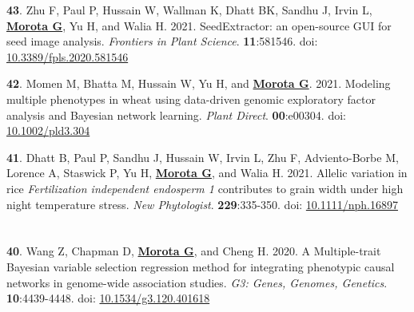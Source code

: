 \documentclass[margin,line,10pt]{res}
\newenvironment{list1}{
  \begin{list}{\ding{113}}{%
      \setlength{\itemsep}{0in}
      \setlength{\parsep}{0in} \setlength{\parskip}{0in}
      \setlength{\topsep}{0in} \setlength{\partopsep}{0in} 
      \setlength{\leftmargin}{0.17in}}}{\end{list}}
\begin{document}
\begin{resume}
\begin{list1}
  \vspace{0.5cm}
  
  \item [{\bf 43}.] Zhu F, Paul P, Hussain W, Wallman K, Dhatt BK, Sandhu J, Irvin L, \textbf{\underline{Morota G}}, Yu H, and Walia H. 2021. SeedExtractor: an open-source GUI for seed image analysis. \emph{Frontiers in Plant Science}. \textbf{11}:581546. doi: \textcolor{blue}{\href{https://doi.org/10.3389/fpls.2020.581546}{10.3389/fpls.2020.581546}}

    \vspace{0.5cm}
    
\item [{\bf 42}.] Momen M, Bhatta M, Hussain W, Yu H, and \textbf{\underline{Morota G}}. 2021. Modeling multiple phenotypes in wheat using data-driven genomic exploratory factor analysis and Bayesian network learning. \emph{Plant Direct}. \textbf{00}:e00304. doi: \textcolor{blue}{\href{https://doi.org/10.1002/pld3.304}{10.1002/pld3.304}}

      \vspace{0.5cm}

  \item [{\bf 41}.] Dhatt B, Paul P, Sandhu J, Hussain W, Irvin L, Zhu F, Adviento-Borbe M, Lorence A, Staswick P, Yu H, \textbf{\underline{Morota G}}, and Walia H. 2021. Allelic variation in rice \textit{Fertilization independent endosperm 1} contributes to grain width under high night temperature stress. \emph{New Phytologist}. \textbf{229}:335-350. doi: \textcolor{blue}{\href{https://doi.org/10.1111/nph.16897}{10.1111/nph.16897}}

  
\end{list1}


\section{}
\begin{list1}

  \item [{\bf 40}.] Wang Z, Chapman D, \textbf{\underline{Morota G}}, and Cheng H. 2020. A Multiple-trait Bayesian variable selection regression method for integrating phenotypic causal networks in genome-wide association studies. \emph{G3: Genes, Genomes, Genetics}. \textbf{10}:4439-4448. doi: \textcolor{blue}{\href{https://doi.org/10.1534/g3.120.401618}{10.1534/g3.120.401618}}

  \vspace{0.5cm}


\end{list1}
\end{resume}
\end{document}
